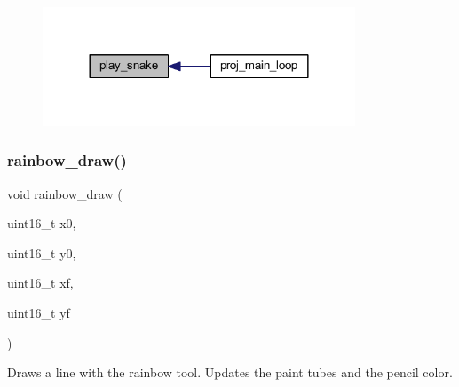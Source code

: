 \begin{figure}[H]
\begin{center}
\leavevmode
\includegraphics[width=264pt]{group__pengoo_gab63f8a21d8bd92b9f638151a9912fa84_icgraph}
\end{center}
\end{figure}
\mbox{\label{group__pengoo_ga113731d7452fe7de36fbd2f4c90e0cb3}} 
\subsubsection{\texorpdfstring{rainbow\+\_\+draw()}{rainbow\_draw()}}
{\footnotesize\ttfamily void rainbow\+\_\+draw (\begin{DoxyParamCaption}\item[{uint16\+\_\+t}]{x0,  }\item[{uint16\+\_\+t}]{y0,  }\item[{uint16\+\_\+t}]{xf,  }\item[{uint16\+\_\+t}]{yf }\end{DoxyParamCaption})}



Draws a line with the rainbow tool. Updates the paint tubes and the pencil color. 


